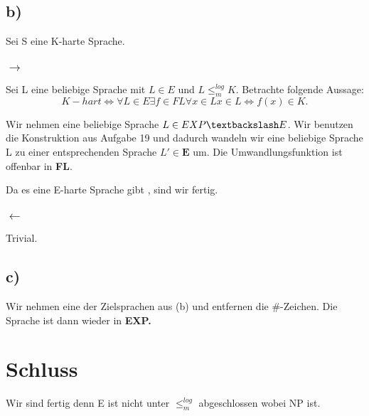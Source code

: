 \documentclass{article}
\begin{document}
		\subsection*{b)}
			Sei S eine K-harte Sprache.

			\subsubsection*{$\rightarrow$}
				Sei L eine beliebige Sprache mit $L \in E$ und $L \leq_m^{log} K$.
				Betrachte folgende Aussage:
					\[
					K-hart \iff \forall L \in E \exists f \in FL \forall x \in L x \in L \iff f(x) \in K.
					\]

				Wir nehmen eine beliebige Sprache $L \in EXP\textbackslash E$. Wir benutzen die Konstruktion aus Aufgabe 19 und dadurch wandeln wir eine beliebige Sprache L zu einer entsprechenden Sprache $L' \in \textbf{E}$
				um. Die Umwandlungsfunktion ist offenbar in \textbf{FL}.

				Da es eine E-harte Sprache gibt , sind wir fertig.
			\subsubsection*{$\leftarrow$}
				Trivial.
		\subsection*{c)}
			Wir nehmen eine der Zielsprachen aus (b) und entfernen die \#-Zeichen. Die Sprache ist dann wieder in \textbf{EXP.}

	\section*{Schluss}
		Wir sind fertig denn E ist nicht unter $\leq_m^{log}$ abgeschlossen wobei NP ist.
\end{document}
